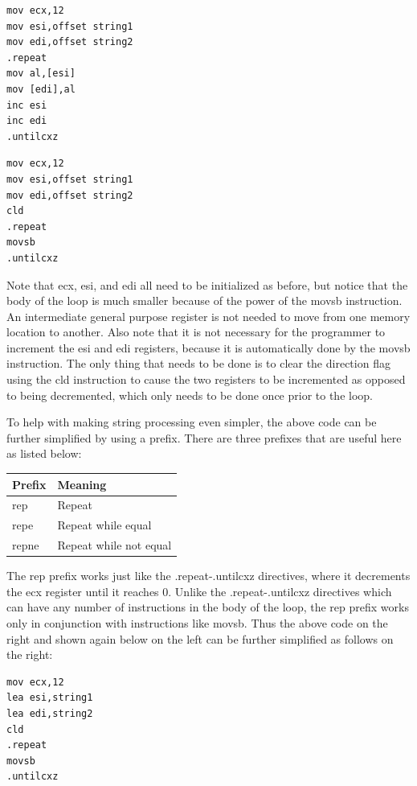 \documentclass[10pt]{book}
\begin{document}
\begin{verbatim}
mov ecx,12
mov esi,offset string1
mov edi,offset string2
.repeat
mov al,[esi]
mov [edi],al
inc esi
inc edi
.untilcxz
\end{verbatim}

\begin{verbatim}
mov ecx,12
mov esi,offset string1
mov edi,offset string2
cld
.repeat
movsb
.untilcxz
\end{verbatim}

Note that ecx, esi, and edi all need to be initialized as before, but notice that the body of the loop is much smaller because of the power of the movsb instruction. An intermediate general purpose register is not needed to move from one memory location to another. Also note that it is not necessary for the programmer to increment the esi and edi registers, because it is automatically done by the movsb instruction. The only thing that needs to be done is to clear the direction flag using the cld instruction to cause the two registers to be incremented as opposed to being decremented, which only needs to be done once prior to the loop.

To help with making string processing even simpler, the above code can be further simplified by using a prefix. There are three prefixes that are useful here as listed below:

\begin{center}
\begin{tabular}{|l|l|}
\hline
Prefix & Meaning \\
\hline
rep & Repeat \\
\hline
repe & Repeat while equal \\
\hline
repne & Repeat while not equal \\
\hline
\end{tabular}
\end{center}

The rep prefix works just like the .repeat-.untilcxz directives, where it decrements the ecx register until it reaches 0. Unlike the .repeat-.untilcxz directives which can have any number of instructions in the body of the loop, the rep prefix works only in conjunction with instructions like movsb. Thus the above code on the right and shown again below on the left can be further simplified as follows on the right:

\begin{verbatim}
mov ecx,12
lea esi,string1
lea edi,string2
cld
.repeat
movsb
.untilcxz
\end{verbatim}
\end{document}
